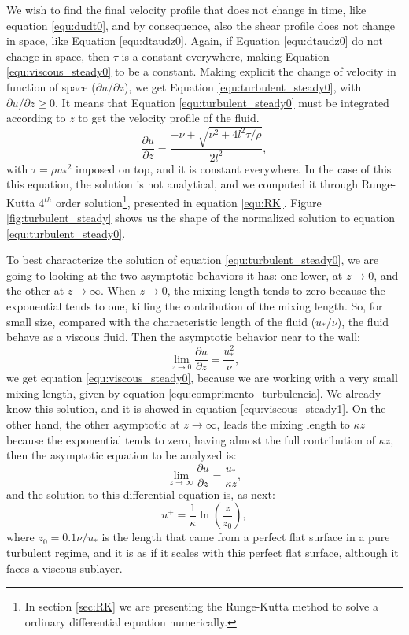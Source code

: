 \begin{apendicesenv}
    We wish to find the final velocity profile that does not change in time, like equation \ref{equ:dudt0}, and by consequence, also the shear profile does not change in space, like Equation \ref{equ:dtaudz0}. Again, if Equation \ref{equ:dtaudz0} do not change in space, then $\tau$ is a constant everywhere, making Equation \ref{equ:viscous_steady0} to be a constant. Making explicit the change of velocity in function of space ($\partial u/\partial z$), we get Equation \ref{equ:turbulent_steady0}, with $\partial u/\partial z \geq 0$. It means that Equation \ref{equ:turbulent_steady0} must be integrated according to $z$ to get the velocity profile of the fluid.
\begin{equation}
    \frac{\partial u}{\partial z} = \frac{-\nu+\sqrt{\nu^2+4l^2\tau/\rho}}{2l^2},
    \label{equ:turbulent_steady0}
\end{equation}
with $\tau = \rho {u_{*}}^{2}$ imposed on top, and it is constant everywhere. In the case of this this equation, the solution is not analytical, and we computed it through Runge-Kutta 4$^{th}$ order solution\footnote{In section \ref{sec:RK} we are presenting the Runge-Kutta method to solve a ordinary differential equation numerically.}, presented in equation \ref{equ:RK}. Figure \ref{fig:turbulent_steady} shows us the shape of the normalized solution to equation \ref{equ:turbulent_steady0}.

    To best characterize the solution of equation \ref{equ:turbulent_steady0}, we are going to looking at the two asymptotic behaviors it has: one lower, at $z\to 0$, and the other at $z\to\infty$. When $z\to 0$, the mixing length tends to zero because the exponential tends to one, killing the contribution of the mixing length. So, for small size, compared with the characteristic length of the fluid ($u_*/\nu$), the fluid behave as a viscous fluid. Then the asymptotic behavior near to the wall:
\begin{equation}
    \lim_{z \to 0} \frac{\partial u}{\partial z} = \frac{u_*^2}{\nu},
\end{equation}
we get equation \ref{equ:viscous_steady0}, because we are working with a very small mixing length, given by equation \ref{equ:comprimento_turbulencia}. We already know this solution, and it is showed in equation \ref{equ:viscous_steady1}. On the other hand, the other asymptotic at $z\to\infty$, leads the mixing length to $\kappa z$ because the exponential tends to zero, having almost the full contribution of $\kappa z$, then the asymptotic equation to be analyzed is:
    \begin{equation}
        \lim_{z \to \infty} \frac{\partial u}{\partial z} = \frac{u_*}{\kappa z},
    \end{equation}
and the solution to this differential equation is, as next:
    \begin{equation}
        u^+ = \frac{1}{\kappa}\ln\left(\frac{z}{z_0}\right),
    \end{equation}
where $z_0=0.1\nu/u_*$ is the length that came from a perfect flat surface in a pure turbulent regime, and it is as if it scales with this perfect flat surface, although it faces a viscous sublayer.


\end{apendicesenv}
